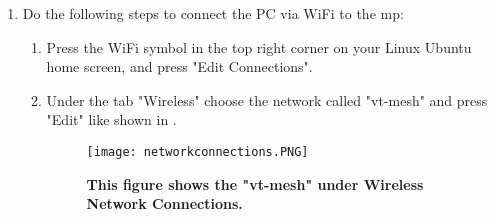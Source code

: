 \begin{enumerate}
\item Do the following steps to connect the PC via WiFi to the \gls{mp}:
\begin{enumerate}
\item Press the WiFi symbol in the top right corner on your Linux Ubuntu home screen, and press "Edit Connections".
\item  Under the tab "Wireless" choose the network called "vt-mesh" and press "Edit" like shown in .
\begin{figure}[h!]
  \centering
      \texttt{[image: networkconnections.PNG]}
  \caption [Network Connections on Linux Ubuntu]{\textbf{This figure shows the "vt-mesh" under Wireless Network Connections.}}
  \label{fig:networkconnections}
\end{figure}


\end{enumerate}
\end{enumerate}
